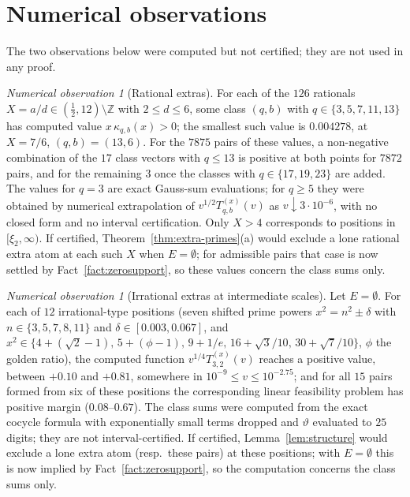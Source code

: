 \documentclass[11pt]{amsart}
\newcommand{\ZZ}{\mathbb Z}
\newcommand{\xin}[1]{\xi_{#1}}
\theoremstyle{definition}
\theoremstyle{remark}
\newtheorem{observation}[theorem]{Numerical observation}
\numberwithin{equation}{section}
\begin{document}
\section{Numerical observations}\label{sec:observations}

The two observations below were computed but not certified; they are not used in any proof.

\begin{observation}[Rational extras]\label{obs:rational-extras}
For each of the $126$ rationals $X=a/d\in(\frac12,12)\setminus\ZZ$ with $2\le d\le6$, some class $(q,b)$ with $q\in\{3,5,7,11,13\}$ has
computed value $x\,\kappa_{q,b}(x)>0$; the smallest such value is $0.004278$, at $X=7/6$, $(q,b)=(13,6)$. For the $7875$ pairs of these
values, a non-negative combination of the $17$ class vectors with $q\le13$ is positive at both points for $7872$ pairs, and for the
remaining $3$ once the classes with $q\in\{17,19,23\}$ are added. The values for $q=3$ are exact Gauss-sum evaluations; for $q\ge5$ they
were obtained by numerical extrapolation of $v^{1/2}T^{(x)}_{q,b}(v)$ as $v\downarrow3\cdot10^{-6}$, with no closed form and no interval
certification. Only $X>4$ corresponds to positions in $[\xin2,\infty)$. If certified, Theorem~\ref{thm:extra-primes}(a) would exclude a lone
rational extra atom at each such $X$ when $E=\emptyset$; for admissible pairs that case is now settled by Fact~\ref{fact:zerosupport}, so
these values concern the class sums only.
\end{observation}

\begin{observation}[Irrational extras at intermediate scales]\label{obs:routeC}
Let $E=\emptyset$. For each of $12$ irrational-type positions (seven shifted prime powers $x^2=n^2\pm\delta$ with $n\in\{3,5,7,8,11\}$ and
$\delta\in[0.003,0.067]$, and $x^2\in\{4+(\sqrt2-1),\,5+(\phi-1),\,9+1/e,\,16+\sqrt3/10,\,30+\sqrt7/10\}$, $\phi$ the golden ratio), the computed
function $v^{1/4}T^{(x)}_{3,2}(v)$ reaches a positive value, between $+0.10$ and $+0.81$, somewhere in $10^{-9}\le v\le10^{-2.75}$; and for all
$15$ pairs formed from six of these positions the corresponding linear feasibility problem has positive margin ($0.08$--$0.67$). The class
sums were computed from the exact cocycle formula with exponentially small terms dropped and $\vartheta$ evaluated to $25$ digits; they are
not interval-certified. If certified, Lemma~\ref{lem:structure} would exclude a lone extra atom (resp.\ these pairs) at these positions;
with $E=\emptyset$ this is now implied by Fact~\ref{fact:zerosupport}, so the computation concerns the class sums only.
\end{observation}
\end{document}
